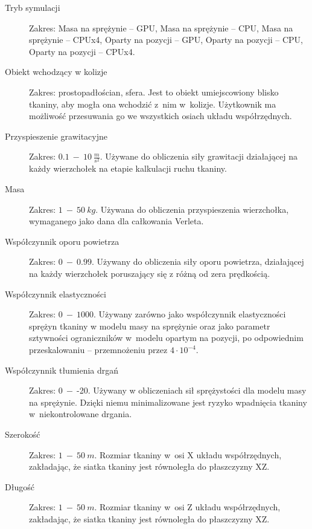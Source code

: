 			\begin{description}
				
				\item[Tryb symulacji] Zakres: Masa na sprężynie -- GPU, Masa na sprężynie -- CPU, Masa na sprężynie -- CPUx4, Oparty na pozycji -- GPU, Oparty na pozycji -- CPU, Oparty na pozycji -- CPUx4.
				
				\item[Obiekt wchodzący w kolizje] Zakres: prostopadłościan, sfera. Jest to obiekt umiejscowiony blisko tkaniny, aby mogła ona wchodzić z~nim w~kolizje. Użytkownik ma możliwość przesuwania go we wszystkich osiach układu współrzędnych.
				
				\item[Przyspieszenie grawitacyjne] Zakres: \(0.1\ -\ 10\ \frac{m}{s^{2}} \). Używane do obliczenia siły grawitacji działającej na każdy wierzchołek na etapie kalkulacji ruchu tkaniny.
				
				\item[Masa] Zakres: \(1\ -\ 50\ kg\). Używana do obliczenia przyspieszenia wierzchołka, wymaganego jako dana dla całkowania Verleta.
				
				\item[Współczynnik oporu powietrza] Zakres: \(0\ -\ 0.99\). Używany do obliczenia siły oporu powietrza, działającej na każdy wierzchołek poruszający się z różną od zera prędkością.
				
				\item[Współczynnik elastyczności] Zakres: \(0\ -\ 1000\). Używany zarówno jako współczynnik elastyczności sprężyn tkaniny w modelu masy na sprężynie oraz jako parametr sztywności ograniczników w~modelu opartym na pozycji, po odpowiednim przeskalowaniu -- przemnożeniu przez \( 4 \cdot 10^{-4} \).
				
				\item[Współczynnik tłumienia drgań] Zakres: \(0\ -\ \)-20. Używany w obliczeniach sił sprężystości dla modelu masy na sprężynie. Dzięki niemu minimalizowane jest ryzyko wpadnięcia tkaniny w~niekontrolowane drgania.
				
				\item[Szerokość] Zakres: \(1\ -\ 50\ m\). Rozmiar tkaniny w~osi X układu współrzędnych, zakładając, że siatka tkaniny jest równoległa do płaszczyzny XZ.
				
				\item[Długość]Zakres: \(1\ -\ 50\ m\). Rozmiar tkaniny w~osi Z układu współrzędnych, zakładając, że siatka tkaniny jest równoległa do płaszczyzny XZ.
				

\end{description}
